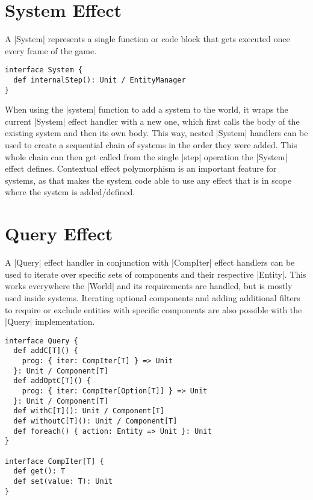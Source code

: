 \section{System Effect}\label{sec:systems}

A |System| represents a single function or code block that gets executed once every frame of the game.

\begin{lstlisting}[caption=System signature]
interface System {
  def internalStep(): Unit / EntityManager
}
\end{lstlisting}

When using the |system| function to add a system to the world, it wraps the current |System| effect handler with a new one, which first calls the body of the existing system and then its own body. This way, nested |System| handlers can be used to create a sequential chain of systems in the order they were added. This whole chain can then get called from the single |step| operation the |System| effect defines. Contextual effect polymorphism is an important feature for systems, as that makes the system code able to use any effect that is in scope where the system is added/defined.

\section{Query Effect}\label{sec:query}

A |Query| effect handler in conjunction with |CompIter| effect handlers can be used to iterate over specific sets of components and their respective |Entity|. This works everywhere the |World| and its requirements are handled, but is mostly used inside systems. Iterating optional components and adding additional filters to require or exclude entities with specific components are also possible with the |Query| implementation.

\begin{lstlisting}[caption=Query and CompIter signatures]
interface Query {
  def addC[T]() {
    prog: { iter: CompIter[T] } => Unit
  }: Unit / Component[T]
  def addOptC[T]() {
    prog: { iter: CompIter[Option[T]] } => Unit
  }: Unit / Component[T]
  def withC[T](): Unit / Component[T]
  def withoutC[T](): Unit / Component[T]
  def foreach() { action: Entity => Unit }: Unit
}

interface CompIter[T] {
  def get(): T
  def set(value: T): Unit
}
\end{lstlisting}

